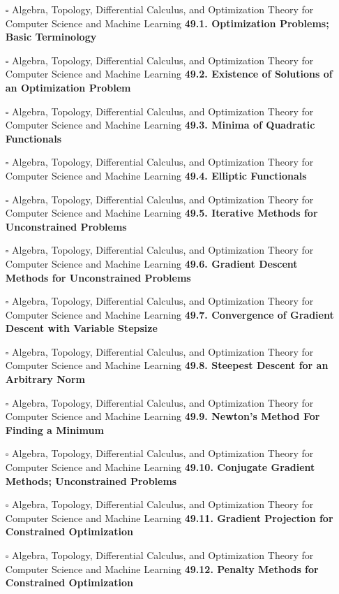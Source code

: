 \documentclass[a4, landscape, 12pt]{article}
\newcommand{\checkbox}{$\square$}%
\begin{document}
\begin{itemize}
{}
\item [\checkbox]  Algebra, Topology, Differential Calculus, and Optimization Theory for Computer Science and Machine Learning \textbf{ 49.1. Optimization Problems; Basic Terminology
}
\item [\checkbox]  Algebra, Topology, Differential Calculus, and Optimization Theory for Computer Science and Machine Learning \textbf{ 49.2. Existence of Solutions of an Optimization Problem
}
\item [\checkbox]  Algebra, Topology, Differential Calculus, and Optimization Theory for Computer Science and Machine Learning \textbf{ 49.3. Minima of Quadratic Functionals
}
\item [\checkbox]  Algebra, Topology, Differential Calculus, and Optimization Theory for Computer Science and Machine Learning \textbf{ 49.4. Elliptic Functionals
}
\item [\checkbox]  Algebra, Topology, Differential Calculus, and Optimization Theory for Computer Science and Machine Learning \textbf{ 49.5. Iterative Methods for Unconstrained Problems
}
\item [\checkbox]  Algebra, Topology, Differential Calculus, and Optimization Theory for Computer Science and Machine Learning \textbf{ 49.6. Gradient Descent Methods for Unconstrained Problems
}
\item [\checkbox]  Algebra, Topology, Differential Calculus, and Optimization Theory for Computer Science and Machine Learning \textbf{ 49.7. Convergence of Gradient Descent with Variable Stepsize
}
\item [\checkbox]  Algebra, Topology, Differential Calculus, and Optimization Theory for Computer Science and Machine Learning \textbf{ 49.8. Steepest Descent for an Arbitrary Norm
}
\item [\checkbox]  Algebra, Topology, Differential Calculus, and Optimization Theory for Computer Science and Machine Learning \textbf{ 49.9. Newton’s Method For Finding a Minimum
}
\item [\checkbox]  Algebra, Topology, Differential Calculus, and Optimization Theory for Computer Science and Machine Learning \textbf{ 49.10. Conjugate Gradient Methods; Unconstrained Problems
}
\item [\checkbox]  Algebra, Topology, Differential Calculus, and Optimization Theory for Computer Science and Machine Learning \textbf{ 49.11. Gradient Projection for Constrained Optimization
}
\item [\checkbox]  Algebra, Topology, Differential Calculus, and Optimization Theory for Computer Science and Machine Learning \textbf{ 49.12. Penalty Methods for Constrained Optimization
}
\end{itemize}
\end{document}
